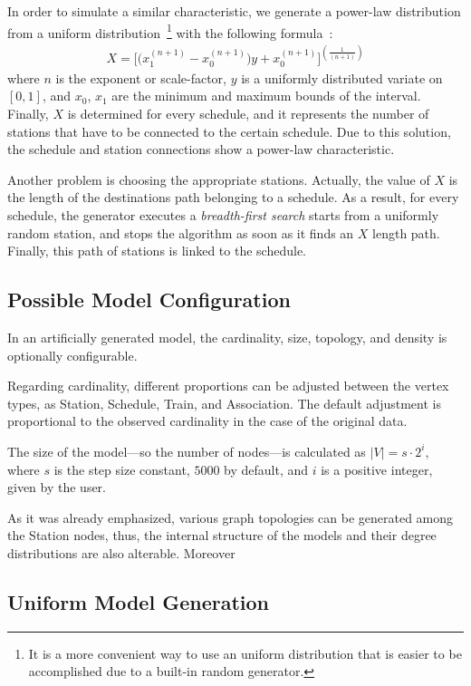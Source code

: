 In order to simulate a similar characteristic, we generate a power-law distribution from a uniform distribution~\footnote{It is a more convenient way to use an uniform distribution that is easier to be accomplished due to a built-in random generator.} with the following formula~\cite{power_law_from_uniform}:
\begin{align}
	X = \Big[\big(x_1^{(n+1)} - x_0^{(n+1)}\big)y + x_0^{(n+1)}\Big]^{(\frac{1}{(n+1)})}
\end{align} 
where $n$ is the exponent or scale-factor, $y$ is a uniformly distributed variate on $[0,1]$, and $x_0$, $x_1$ are the minimum and maximum bounds of the interval. Finally, $X$ is determined for every schedule, and it represents the number of stations that have to be connected to the certain schedule. Due to this solution, the schedule and station connections show a power-law characteristic.

Another problem is choosing the appropriate stations. Actually, the value of $X$ is the length of the destinations path belonging to a schedule. As a result, for every schedule, the generator executes a \textit{breadth-first search} starts from a uniformly random station, and stops the algorithm as soon as it finds an $X$ length path. Finally, this path of stations is linked to the schedule.


\subsection{Possible Model Configuration}

In an artificially generated model, the cardinality, size, topology, and density is optionally configurable. 

Regarding cardinality, different proportions can be adjusted between the vertex types, as \textsf{Station}, \textsf{Schedule}, \textsf{Train}, and \textsf{Association}. The default adjustment is proportional to the observed cardinality in the case of the original data.

The size of the model---so the number of nodes---is calculated as $|V| = s \cdot 2^i$, where $s$ is the step size constant, $5000$ by default, and $i$ is a positive integer, given by the user.

As it was already emphasized, various graph topologies can be generated among the \textsf{Station} nodes, thus, the internal structure of the models and their degree distributions are also alterable. Moreover %

\subsection{Uniform Model Generation}

